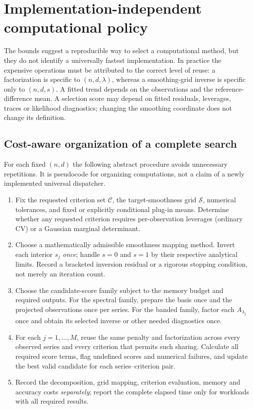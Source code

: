 \section{Implementation-independent computational policy}
\label{sec:policy}
The bounds suggest a reproducible way to select a computational method,
but they do not identify a universally fastest implementation. In practice the expensive
operations must be attributed to the correct level of reuse:
a factorization is specific to $(n,d,\lambda)$, whereas
a smoothing-grid inverse is specific only to $(n,d,s)$.
A fitted trend depends on the observations and the
reference-difference mean. A selection score may depend
on fitted residuals, leverages, traces or likelihood diagnostics;
changing the smoothing coordinate does not change its definition.

\subsection{Cost-aware organization of a complete search}
For each fixed $(n,d)$ the following abstract procedure
avoids unnecessary repetitions. It is pseudocode for
organizing computations, not a claim of a newly implemented
universal dispatcher.
\begin{enumerate}
\item Fix the requested criterion set $\mathcal C$,
the target-smoothness grid $\mathcal S$, numerical tolerances,
and fixed or explicitly conditional plug-in means.
Determine whether any requested criterion requires
per-observation leverages (ordinary CV) or a
Gaussian marginal determinant.
\item Choose a mathematically admissible smoothness
mapping method. Invert each interior $s_j$ \emph{once};
handle $s=0$ and $s=1$ by their respective analytical
limits. Record a bracketed inversion residual or a
rigorous stopping condition, not merely an iteration count.
\item Choose the candidate-score family subject to the
memory budget and required outputs. For the spectral
family, prepare the basis once and the projected
observations once per series. For the banded family,
factor each $A_{\lambda_j}$ once and obtain its
selected inverse or other needed diagnostics once.
\item For each $j=1,\ldots,M$, reuse the same penalty
and factorization across every observed series and
every criterion that permits such sharing. Calculate
all required score terms, flag undefined scores and
numerical failures, and update the best valid
candidate for each series--criterion pair.
\item Record the decomposition, grid mapping,
criterion evaluation, memory and accuracy costs
\emph{separately}; report the complete elapsed time
only for workloads with all required results.
\end{enumerate}

